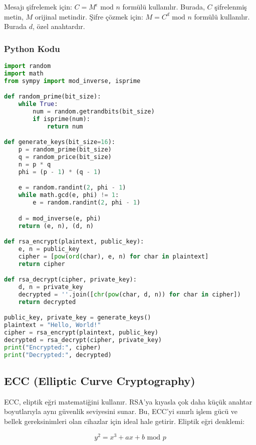 Mesajı şifrelemek için: $C = M^{\epsilon} \text{ mod } n$ formülü kullanılır. Burada, $C$ şifrelenmiş metin, $M$ orijinal metindir. Şifre çözmek için: $M = C^{d} \text{ mod } n$ formülü kullanılır. Burada $d$, özel anahtardır.

\subsubsection{Python Kodu}

\begin{lstlisting}[language=Python]
import random
import math
from sympy import mod_inverse, isprime

def random_prime(bit_size):
    while True:
        num = random.getrandbits(bit_size)
        if isprime(num):
            return num

def generate_keys(bit_size=16):
    p = random_prime(bit_size)
    q = random_price(bit_size)
    n = p * q
    phi = (p - 1) * (q - 1)

    e = random.randint(2, phi - 1)
    while math.gcd(e, phi) != 1:
        e = random.randint(2, phi - 1)

    d = mod_inverse(e, phi)
    return (e, n), (d, n)

def rsa_encrypt(plaintext, public_key):
    e, n = public_key
    cipher = [pow(ord(char), e, n) for char in plaintext]
    return cipher

def rsa_decrypt(cipher, private_key):
    d, n = private_key
    decrypted = ''.join([chr(pow(char, d, n)) for char in cipher])
    return decrypted

public_key, private_key = generate_keys()
plaintext = "Hello, World!"
cipher = rsa_encrypt(plaintext, public_key)
decrypted = rsa_decrypt(cipher, private_key)
print("Encrypted:", cipher)
print("Decrypted:", decrypted)
\end{lstlisting}

\newpage

\subsection{ECC (Elliptic Curve Cryptography)}

ECC, eliptik eğri matematiğini kullanır. RSA'ya kıyasla çok daha küçük anahtar boyutlarıyla aynı güvenlik seviyesini sunar. Bu, ECC'yi sınırlı işlem gücü ve bellek gereksinimleri olan cihazlar için ideal hale getirir. Eliptik eğri denklemi:

\[ y^2 = x^3 + ax + b \text{ mod } p \]

